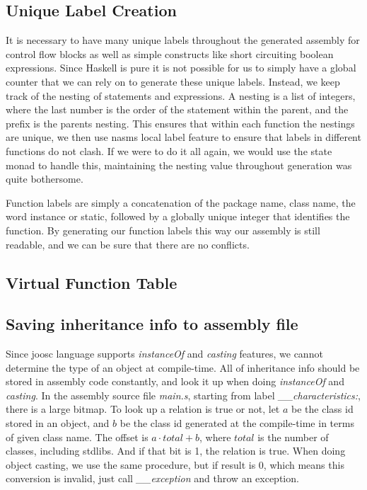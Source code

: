 \documentclass[12pt,letterpaper]{article}
\begin{document}
\subsection{Unique Label Creation}
It is necessary to have many unique labels throughout the generated assembly for control flow blocks as well as simple constructs like short circuiting boolean expressions.
Since Haskell is pure it is not possible for us to simply have a global counter that we can rely on to generate these unique labels.
Instead, we keep track of the nesting of statements and expressions.
A nesting is a list of integers, where the last number is the order of the statement within the parent, and the prefix is the parents nesting.
This ensures that within each function the nestings are unique, we then use nasms local label feature to ensure that labels in different functions do not clash.
If we were to do it all again, we would use the state monad to handle this, maintaining the nesting value throughout generation was quite bothersome.

Function labels are simply a concatenation of the package name, class name, the word instance or static, followed by a globally unique integer that identifies the function.
By generating our function labels this way our assembly is still readable, and we can be sure that there are no conflicts.


\subsection{Virtual Function Table}

\subsection{Saving inheritance info to assembly file}
Since joosc language supports \emph{instanceOf} and \emph{casting} features, we cannot determine the type of an object at compile-time.
All of inheritance info should be stored in assembly code constantly, and look it up when doing \emph{instanceOf} and \emph{casting}.
In the assembly source file \emph{main.s}, starting from label \emph{\_\_characteristics:}, there is a large bitmap.
To look up a relation is true or not, let $a$ be the class id stored in an object, and $b$ be the class id generated at the compile-time in terms of given class name.
The offset is $a \cdot total + b$, where $total$ is the number of classes, including stdlibs.
And if that bit is 1, the relation is true.
When doing object casting, we use the same procedure, but if result is 0, which means this conversion is invalid, just call \emph{\_\_exception} and throw an exception.
\end{document}
